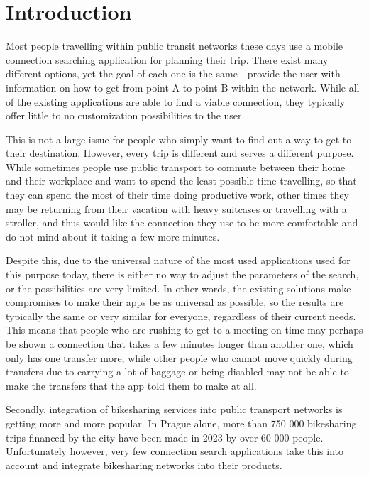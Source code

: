 \chapter*{Introduction}

Most people travelling within public transit networks these days use a mobile connection searching application for planning their trip. There exist many different options, yet the goal of each one is the same - provide the user with information on how to get from point A to point B within the network. While all of the existing applications are able to find a viable connection, they typically offer little to no customization possibilities to the user. 

This is not a large issue for people who simply want to find out a way to get to their destination. However, every trip is different and serves a different purpose. While sometimes people use public transport to commute between their home and their workplace and want to spend the least possible time travelling, so that they can spend the most of their time doing productive work, other times they may be returning from their vacation with heavy suitcases or travelling with a stroller, and thus would like the connection they use to be more comfortable and do not mind about it taking a few more minutes.

Despite this, due to the universal nature of the most used applications used for this purpose today, there is either no way to adjust the parameters of the search, or the possibilities are very limited. In other words, the existing solutions make compromises to make their apps be as universal as possible, so the results are typically the same or very similar for everyone, regardless of their current needs. This means that people who are rushing to get to a meeting on time may perhaps be shown a connection that takes a few minutes longer than another one, which only has one transfer more, while other people who cannot move quickly during transfers due to carrying a lot of baggage or being disabled may not be able to make the transfers that the app told them to make at all.

Secondly, integration of bikesharing services into public transport networks is getting more and more popular. In Prague alone, more than 750 000 bikesharing trips financed by the city have been made in 2023 by over 60 000 people\cite{ZpravodajPID2024}. Unfortunately however, very few connection search applications take this into account and integrate bikesharing networks into their products.

